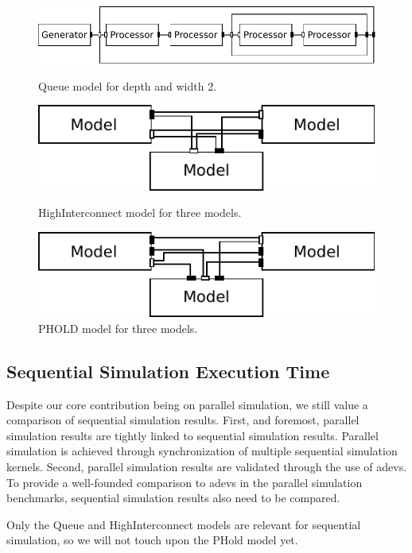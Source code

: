 \newcommand{\modelfraction}{0.65}

\begin{figure}
    \center
    \includegraphics[width=\columnwidth]{fig/queue_model.pdf}
    \caption{Queue model for depth and width 2.}
    \label{fig:queue_model}

    \includegraphics[width=\modelfraction\columnwidth]{fig/interconnect_model.pdf}
    \caption{HighInterconnect model for three models.}
    \label{fig:interconnect_model}

    \includegraphics[width=\modelfraction\columnwidth]{fig/phold_model.pdf}
    \caption{PHOLD model for three models.}
    \label{fig:PHOLD_model}
\end{figure}

\subsection{Sequential Simulation Execution Time}
Despite our core contribution being on parallel simulation, we still value a comparison of sequential simulation results.
First, and foremost, parallel simulation results are tightly linked to sequential simulation results.
Parallel simulation is achieved through synchronization of multiple sequential simulation kernels.
Second, parallel simulation results are validated through the use of adevs.
To provide a well-founded comparison to adevs in the parallel simulation benchmarks, sequential simulation results also need to be compared.

Only the Queue and HighInterconnect models are relevant for sequential simulation, so we will not touch upon the PHold model yet.

